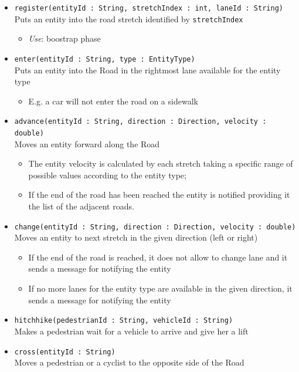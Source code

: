 \begin{itemize}
	\item \texttt{register(entityId : String, stretchIndex : int, laneId : String)}
	\\Puts an entity into the road stretch identified by \texttt{stretchIndex}
	\begin{itemize}
		\item \textit{Use}: boostrap phase
	\end{itemize}
	\item \texttt{enter(entityId : String, type : EntityType)}
	\\Puts an entity into the Road in the rightmost lane available for the entity type
	\begin{itemize}
		\item E.g. a car will not enter the road on a sidewalk
	\end{itemize}
	\item \texttt{advance(entityId : String, direction : Direction, velocity : double)}
	\\Moves an entity forward along the Road	
	\begin{itemize}
		\item The entity velocity is calculated by each stretch taking a specific range of possible values according to the entity type;
		\item If the end of the road has been reached the entity is notified providing it the list of the adjacent roads.
	\end{itemize}
	\item \texttt{change(entityId : String, direction : Direction, velocity : double)}
	\\Moves an entity to next stretch in the given direction (left or right)	
	\begin{itemize}
		\item If the end of the road is reached, it does not allow to change lane and it sends a message for notifying the entity
		\item If no more lanes for the entity type are available in the given direction, it sends a message for notifying the entity
	\end{itemize}
	\item \texttt{hitchhike(pedestrianId : String, vehicleId : String)}
	\\Makes a pedestrian wait for a vehicle to arrive and give her a lift
	\item \texttt{cross(entityId : String)}
	\\Moves a pedestrian or a cyclist to the opposite side of the Road

\end{itemize}
